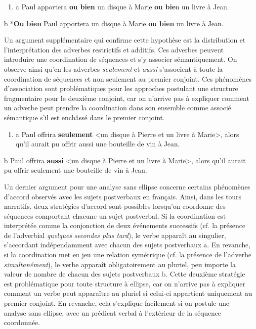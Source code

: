 \begin{enumerate}
\item \label{bkm:Ref302394834}a   Paul apportera \textbf{ou bien} un disque à Marie \textbf{ou bie}n un livre à Jean. 


\end{enumerate}
  b  *\textbf{Ou bien} Paul apportera un disque à Marie \textbf{ou bien} un livre à Jean. 

Un argument supplémentaire qui confirme cette hypothèse est la distribution et l'interprétation des adverbes restrictifs et additifs. Ces adverbes peuvent introduire une coordination de séquences et s'y associer sémantiquement. On observe ainsi qu'en  les adverbes \textit{seulement} et \textit{aussi} s'associent à toute la coordination de séquences et non seulement au premier conjoint. Ces phénomènes d'association sont problématiques pour les approches postulant une structure fragmentaire pour le deuxième conjoint, car on n'arrive pas à expliquer comment un adverbe peut prendre la coordination dans son ensemble comme associé sémantique s'il est enchâssé dans le premier conjoint.


\begin{enumerate}
\item \label{bkm:Ref290310729}a   Paul offrira \textbf{seulement} {\textless}un disque à Pierre et un livre à Marie{\textgreater}, alors qu'il aurait pu offrir aussi une bouteille de vin à Jean. 


\end{enumerate}
  b  Paul offrira \textbf{aussi} {\textless}un disque à Pierre et un livre à Marie{\textgreater}, alors qu'il aurait pu offrir seulement une bouteille de vin à Jean.  

Un dernier argument pour une analyse sans ellipse concerne certains phénomènes d'accord observés avec les sujets postverbaux en français. Ainsi, dans les tours narratifs, deux stratégies d'accord sont possibles lorsqu'on coordonne des séquences comportant chacune un sujet postverbal. Si la coordination est interprétée comme la conjonction de deux événements successifs (cf. la présence de l'adverbial \textit{quelques secondes plus tard}), le verbe apparaît au singulier, s'accordant indépendamment avec chacun des sujets postverbaux a. En revanche, si la coordination met en jeu une relation symétrique (cf. la présence de l'adverbe \textit{simultanément}), le verbe apparaît obligatoirement au pluriel, peu importe la valeur de nombre de chacun des sujets postverbaux b. Cette deuxième stratégie est problématique pour toute structure à ellipse, car on n'arrive pas à expliquer comment un verbe peut apparaître au pluriel si celui-ci appartient uniquement au premier conjoint. En revanche, cela s'explique facilement si on postule une analyse sans ellipse, avec un prédicat verbal à l'extérieur de la séquence coordonnée. 


